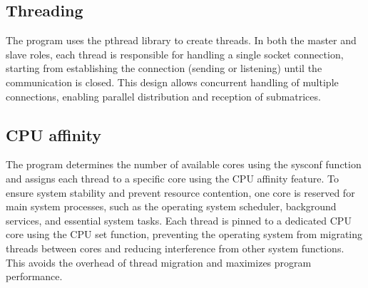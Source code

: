 \documentclass[journal]{./IEEE/IEEEtran}
\begin{document}
\subsection{Threading}
The program uses the pthread library to create threads. In both the master and slave roles, each thread is responsible for handling a single socket connection, starting from establishing the connection (sending or listening) until the communication is closed. This design allows concurrent handling of multiple connections, enabling parallel distribution and reception of submatrices.

\subsection{CPU affinity}
The program determines the number of available cores using the sysconf function and assigns each thread to a specific core using the CPU affinity feature. To ensure system stability and prevent resource contention, one core is reserved for main system processes, such as the operating system scheduler, background services, and essential system tasks. Each thread is pinned to a dedicated CPU core using the CPU set function, preventing the operating system from migrating threads between cores and reducing interference from other system functions. This avoids the overhead of thread migration and maximizes program performance.




\end{document}
